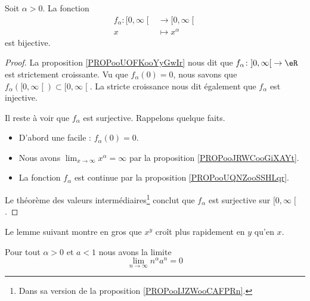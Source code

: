 \begin{proposition}     \label{PROPooEXGKooCqzLor}
	Soit \( \alpha>0\). La fonction
	\begin{equation}
		\begin{aligned}
			f_{\alpha}\colon \mathopen[ 0 , \infty \mathclose[ & \to \mathopen[ 0 , \infty \mathclose[ \\
			x                                                  & \mapsto x^{\alpha}
		\end{aligned}
	\end{equation}
	est bijective.
\end{proposition}

\begin{proof}
	La proposition \ref{PROPooUOFKooYyGwIr} nous dit que \( f_{\alpha}\colon \mathopen] 0 , \infty \mathclose[\to \eR\) est strictement croissante. Vu que  \( f_{\alpha}(0)=0\), nous savons que \( f_{\alpha}(\mathopen[ 0 , \infty \mathclose[)\subset\mathopen[ 0 , \infty \mathclose[\). La stricte croissance nous dit également que \( f_{\alpha}\) est injective.

	Il reste à voir que \( f_{\alpha}\) est surjective. Rappelons quelque faits.
	\begin{itemize}
		\item D'abord une facile :     \( f_{\alpha}(0)=0\).
		\item
		      Nous avons \( \lim_{x\to \infty} x^{\alpha}=\infty\) par la proposition \ref{PROPooJRWCooGiXAYt}.
		\item
		      La fonction \( f_{\alpha}\) est continue par la proposition \ref{PROPooUQNZooSSHLqr}.
	\end{itemize}
	Le théorème des valeurs intermédiaires\footnote{Dans sa version de la proposition \ref{PROPooIJZWooCAFPRn}.} conclut que \( f_{\alpha}\) est surjective sur \( \mathopen[ 0 , \infty \mathclose[\).
\end{proof}

Le lemme suivant montre en gros que \( x^y\) croît plus rapidement en \( y\) qu'en \( x\).
\begin{lemma}       \label{LemLJOSooEiNtTs}
	Pour tout \( \alpha>0\) et \( a<1\) nous avons la limite
	\begin{equation}
		\lim_{n\to \infty} n^{\alpha}a^n=0
	\end{equation}
\end{lemma}

